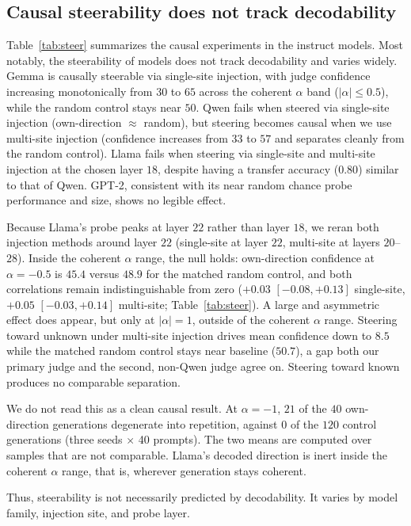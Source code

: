 \documentclass{article}
\begin{document}
\subsection{Causal steerability does not track decodability}
\label{sec:steer_causal}

Table~\ref{tab:steer} summarizes the causal experiments in the instruct models. Most notably, the steerability of models does not track decodability and varies widely. Gemma is causally steerable via single-site injection, with judge confidence increasing monotonically from $30$ to $65$ across the coherent $\alpha$ band ($|\alpha| \le 0.5$), while the random control stays near $50$. Qwen fails when steered via single-site injection (own-direction $\approx$ random), but steering becomes causal when we use multi-site injection (confidence increases from $33$ to $57$ and separates cleanly from the random control). Llama fails when steering via single-site and multi-site injection at the chosen layer $18$, despite having a transfer accuracy ($0.80$) similar to that of Qwen. GPT-2, consistent with its near random chance probe performance and size, shows no legible effect.

Because Llama's probe peaks at layer $22$ rather than layer $18$, we reran both injection methods around layer $22$ (single-site at layer $22$, multi-site at layers $20$--$28$). Inside the coherent $\alpha$ range, the null holds: own-direction confidence at $\alpha = -0.5$ is $45.4$ versus $48.9$ for the matched random control, and both correlations remain indistinguishable from zero ($+0.03$ $[-0.08, +0.13]$ single-site, $+0.05$ $[-0.03, +0.14]$ multi-site; Table~\ref{tab:steer}). A large and asymmetric effect does appear, but only at $|\alpha| = 1$, outside of the coherent $\alpha$ range. Steering toward unknown under multi-site injection drives mean confidence down to $8.5$ while the matched random control stays near baseline ($50.7$), a gap both our primary judge and the second, non-Qwen judge agree on. Steering toward known produces no comparable separation.

We do not read this as a clean causal result. At $\alpha = -1$, $21$ of the $40$ own-direction generations degenerate into repetition, against $0$ of the $120$ control generations (three seeds $\times$ 40 prompts). The two means are computed over samples that are not comparable. Llama's decoded direction is inert inside the coherent $\alpha$ range, that is, wherever generation stays coherent.

Thus, steerability is not necessarily predicted by decodability. It varies by model family, injection site, and probe layer.
\end{document}
